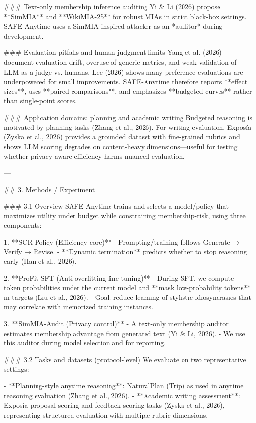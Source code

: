 ### Text-only membership inference auditing  
Yi & Li (2026) propose **SimMIA** and **WikiMIA-25** for robust MIAs in strict black-box settings. SAFE-Anytime uses a SimMIA-inspired attacker as an *auditor* during development.

### Evaluation pitfalls and human judgment limits  
Yang et al. (2026) document evaluation drift, overuse of generic metrics, and weak validation of LLM-as-a-judge vs. humans. Lee (2026) shows many preference evaluations are underpowered for small improvements. SAFE-Anytime therefore reports **effect sizes**, uses **paired comparisons**, and emphasizes **budgeted curves** rather than single-point scores.

### Application domains: planning and academic writing  
Budgeted reasoning is motivated by planning tasks (Zhang et al., 2026). For writing evaluation, Exposía (Zyska et al., 2026) provides a grounded dataset with fine-grained rubrics and shows LLM scoring degrades on content-heavy dimensions—useful for testing whether privacy-aware efficiency harms nuanced evaluation.

---

## 3. Methods / Experiment  

### 3.1 Overview  
SAFE-Anytime trains and selects a model/policy that maximizes utility under budget while constraining membership-risk, using three components:

1. **SCR-Policy (Efficiency core)**  
   - Prompting/training follows Generate → Verify → Revise.  
   - **Dynamic termination** predicts whether to stop reasoning early (Han et al., 2026).  

2. **ProFit-SFT (Anti-overfitting fine-tuning)**  
   - During SFT, we compute token probabilities under the current model and **mask low-probability tokens** in targets (Liu et al., 2026).  
   - Goal: reduce learning of stylistic idiosyncrasies that may correlate with memorized training instances.

3. **SimMIA-Audit (Privacy control)**  
   - A text-only membership auditor estimates membership advantage from generated text (Yi & Li, 2026).  
   - We use this auditor during model selection and for reporting.

### 3.2 Tasks and datasets (protocol-level)  
We evaluate on two representative settings:

- **Planning-style anytime reasoning**: NaturalPlan (Trip) as used in anytime reasoning evaluation (Zhang et al., 2026).  
- **Academic writing assessment**: Exposía proposal scoring and feedback scoring tasks (Zyska et al., 2026), representing structured evaluation with multiple rubric dimensions.


